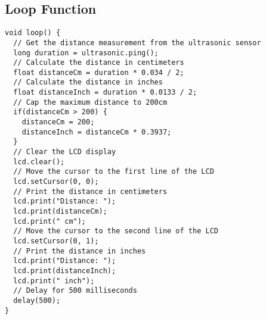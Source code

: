 \documentclass{article}
\begin{document}
\subsection{Loop Function}

\begin{verbatim}
void loop() {
  // Get the distance measurement from the ultrasonic sensor
  long duration = ultrasonic.ping();
  // Calculate the distance in centimeters
  float distanceCm = duration * 0.034 / 2;
  // Calculate the distance in inches
  float distanceInch = duration * 0.0133 / 2;
  // Cap the maximum distance to 200cm
  if(distanceCm > 200) {
    distanceCm = 200;
    distanceInch = distanceCm * 0.3937;
  }
  // Clear the LCD display
  lcd.clear();
  // Move the cursor to the first line of the LCD
  lcd.setCursor(0, 0);
  // Print the distance in centimeters
  lcd.print("Distance: ");
  lcd.print(distanceCm);
  lcd.print(" cm");
  // Move the cursor to the second line of the LCD
  lcd.setCursor(0, 1);
  // Print the distance in inches
  lcd.print("Distance: ");
  lcd.print(distanceInch);
  lcd.print(" inch");
  // Delay for 500 milliseconds
  delay(500);
}
\end{verbatim}
\end{document}
